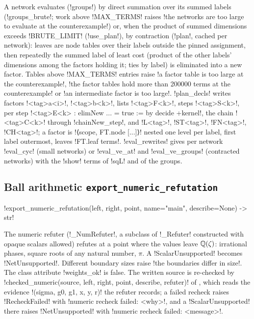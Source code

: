 {{{A network evaluates (\lexpy!groups!) by direct summation over its summed labels
(\lexpy!groups_brute!; work above \lexpy!MAX_TERMS! raises
\lexcode!the networks are too large to evaluate at the counterexample!) or, when the product of
summed dimensions exceeds \lexpy!BRUTE_LIMIT! (\lexpy!use_plan!), by contraction (\lexpy!plan!, cached
per network): leaves are node tables over their labels outside the pinned assignment, then
repeatedly the summed label of least cost (product of the other labels' dimensions among the
factors holding it; ties by label) is eliminated into a new factor. Tables above
\lexpy!MAX_TERMS! entries raise \lexcode!a factor table is too large at the counterexample!,
\lexcode!the factor tables hold more than 200000 terms at the counterexample! or
\lexcode!an intermediate factor is too large!. \lexpy!plan_decls! writes factors \lexlean!<tag>a<i>!,
\lexlean!<tag>b<k>!, lists \lexlean!<tag>F<k>!, steps \lexlean!<tag>S<k>!, per step
\lexlean!<tag>E<k> : elimNew ... = true := by decide +kernel!, the chain \lexlean!<tag>C<k>! through
\lexlean!chainNew_step!, and \lexlean!L<tag>!, \lexlean!ST<tag>!, \lexlean!FN<tag>!, \lexlean!CH<tag>!; a factor
is \lexlean!⟨scope, FT.node [...]⟩! nested one level per label, first label outermost, leaves
\lexlean!FT.leaf terms!. \lexpy!eval_rewrites! gives per network \lexlean!eval_cyc! (small networks) or
\lexlean!eval_ve_at! and \lexlean!eval_ve_groups! (contracted networks) with the \lexlean!show! terms of
\lexlean!sqL! and of the groups.

\subsection{Ball arithmetic \texttt{export\_numeric\_refutation}}\label{sec:lean-export-numeric}

\begin{signature}
\lexpy!export_numeric_refutation(left, right, point, name="main", describe=None) -> str!
\end{signature}
The numeric refuter (\lexpy!_NumRefuter!, a subclass of \lexpy!_Refuter! constructed with opaque
scalars allowed) refutes at a point where the values leave $\mathbb{Q}(\zeta)$: irrational phases, square
roots of any natural number, $\pi$. A \lexpy!ScalarUnsupported! becomes \lexpy!NetUnsupported!.
Different boundary sizes raise \lexcode!the boundaries differ in size!. The class attribute
\lexpy!weights_ok! is false. The written source is re-checked by
\lexpy!checked_numeric(source, left, right, point, describe, refuter)! of
, which reads the evidence
\lexpy!(sigma, g0, g1, x, y, r)! the refuter records; a failed recheck raises \lexpy!RecheckFailed!
with \lexcode!numeric recheck failed: <why>!, and a \lexpy!ScalarUnsupported! there raises
\lexpy!NetUnsupported! with \lexcode!numeric recheck failed: <message>!.

}}}

